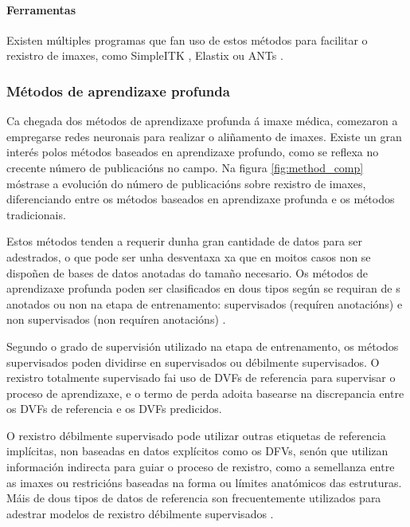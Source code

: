 \paragraph{Ferramentas}

Existen múltiples programas que fan uso de estos métodos para facilitar o rexistro de imaxes, como SimpleITK \cite{simpleitk}, Elastix \cite{elastix} ou ANTs \cite{ants}.

\subsubsection{Métodos de aprendizaxe profunda}
\label{subsubsec:Métodos de aprendizaxe profunda}

Ca chegada dos métodos de aprendizaxe profunda á imaxe médica, comezaron a empregarse redes neuronais para realizar o aliñamento de imaxes.
Existe un gran interés polos métodos baseados en aprendizaxe profundo, como se reflexa no crecente número de publicacións no campo. Na figura \ref{fig:method_comp} móstrase a evolución do número de publicacións sobre rexistro de imaxes, diferenciando entre os métodos baseados en aprendizaxe profunda e os métodos tradicionais.

Estos métodos tenden a requerir dunha gran cantidade de datos para ser adestrados, o que pode ser unha desventaxa xa que en moitos casos non se dispoñen de bases de datos anotadas do tamaño necesario.
Os métodos de aprendizaxe profunda poden ser clasificados en dous tipos según se requiran de s anotados ou non na etapa de entrenamento:
supervisados (requíren anotacións) e non supervisados (non requíren anotacións) \cite{nie2024medicalimageregistrationapplication}.

Segundo o grado de supervisión utilizado na etapa de entrenamento, os métodos supervisados poden dividirse en supervisados ou débilmente supervisados.
O rexistro totalmente supervisado fai uso de DVFs de referencia para supervisar o proceso de aprendizaxe, e o termo de perda adoita basearse na discrepancia entre os DVFs de referencia e os DVFs predicidos.

O rexistro débilmente supervisado pode utilizar outras etiquetas de referencia implícitas, non baseadas en datos explícitos como os DFVs, senón que utilizan información indirecta para guiar o proceso de rexistro, como a semellanza entre as imaxes ou restricións baseadas na forma ou límites anatómicos das estruturas.
Máis de dous tipos de datos de referencia son frecuentemente utilizados para adestrar modelos de rexistro débilmente supervisados \cite{bharati2022deeplearningmedicalimage}.

